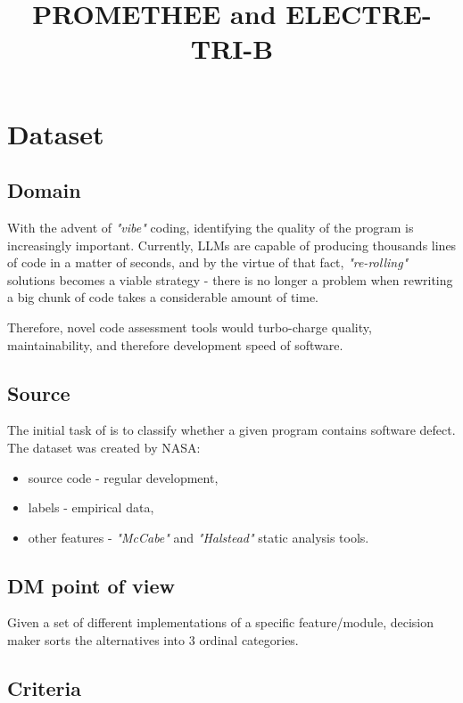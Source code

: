 \documentclass{article}
\title{PROMETHEE and ELECTRE-TRI-B}
\begin{document}
\maketitle

\section{Dataset}
\subsection{Domain}

With the advent of \textit{"vibe"} coding, identifying the quality of the program is increasingly important. Currently, LLMs are capable of producing thousands lines of code in a matter of seconds, and by the virtue of that fact, \textit{"re-rolling"} solutions becomes a viable strategy - there is no longer a problem when rewriting a big chunk of code takes a considerable amount of time.

 \par 

Therefore, novel code assessment tools would turbo-charge quality, maintainability, and therefore development speed of software.

\subsection{Source}
The initial task of is to classify whether a given program contains software defect. The dataset was created by NASA:

\begin{itemize}
    \item source code - regular development,
    \item labels - empirical data,
    \item other features - \textit{"McCabe"} and \textit{"Halstead"} static analysis tools.
\end{itemize}

\subsection{DM point of view}
Given a set of different implementations of a specific feature/module, decision maker sorts the alternatives into 3 ordinal categories.

\subsection{Criteria}
\end{document}
